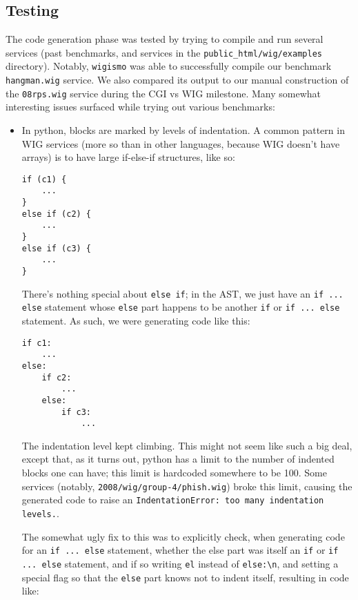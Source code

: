 \documentclass{WigReport}
\begin{document}
\subsection{Testing}
The code generation phase was tested by trying to compile and run several
services (past benchmarks, and services in the 
{\tt public\_html/wig/examples} directory). Notably, {\tt wigismo} was 
able to successfully compile our benchmark {\tt hangman.wig} service. We 
also compared its output to our manual construction of the {\tt 08rps.wig}
service during the CGI vs WIG milestone. Many somewhat interesting issues
surfaced while trying out various benchmarks:

\begin{itemize}
\item In python, blocks are marked by levels of indentation. A common 
pattern in WIG services (more so than in other languages, because WIG 
doesn't have arrays) is to have large if-else-if structures, like so:

\begin{verbatim}
if (c1) {
    ...
}
else if (c2) {
    ...
}
else if (c3) {
    ...
}
\end{verbatim}

There's nothing special about {\tt else if}; in the AST, we just have an
{\tt if ... else} statement whose {\tt else} part happens to be another
{\tt if} or {\tt if ... else} statement. As such, we were generating code
like this:

\begin{verbatim}
if c1:
    ...
else:
    if c2:
        ...
    else:
        if c3:
            ...
\end{verbatim}

The indentation level kept climbing. This might not seem like such a big
deal, except that, as it turns out, python has a limit to the number of
indented blocks one can have; this limit is hardcoded somewhere to be 100.
Some services (notably, {\tt 2008/wig/group-4/phish.wig}) broke this
limit, causing the generated code to raise an {\tt IndentationError: 
too many indentation levels.}.

The somewhat ugly fix to this was to explicitly check, when generating
code for an {\tt if ... else} statement, whether the else part was itself
an {\tt if} or {\tt if ... else} statement, and if so writing {\tt el}
instead of {\tt else:\textbackslash n}, and setting a special flag so that
the {\tt else} part knows not to indent itself, resulting in code like:


\end{itemize}
\end{document}

